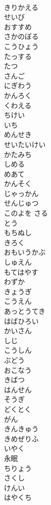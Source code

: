 \documentclass[8pt]{extreport}
\begin{document}
\begin{CJK}{UTF8}{min}
\\	きりかえる
\\	せいび
\\	おすすめ
\\	さかのぼる
\\	こうひょう
\\	たっする
\\	たつ
\\	さんご
\\	にぎわう
\\	かんろく
\\	くわえる
\\	ちけい
\\	いち
\\	めんせき
\\	せいたいけい
\\	かたみち
\\	しめる
\\	めあて
\\	かんそく
\\	じゃっかん
\\	せんじゅつ
\\	このよを さる
\\	とう
\\	もちぬし
\\	きろく
\\	おもいうかぶ
\\	しゅえん
\\	もてはやす
\\	わずか
\\	きょうぎ
\\	こうえん
\\	あっとうてき
\\	はばひろい
\\	かいさん
\\	しじ
\\	こうしん
\\	ぶどう
\\	おこなう
\\	きばつ
\\	はんせん
\\	そうぎ
\\	どくとく
\\	がん
\\	きんきゅう
\\	きめぜりふ
\\	いやく
\\	永眠
\\	ちりょう
\\	さくし
\\	けんい
\\	はやくち

\end{CJK}
\end{document}
